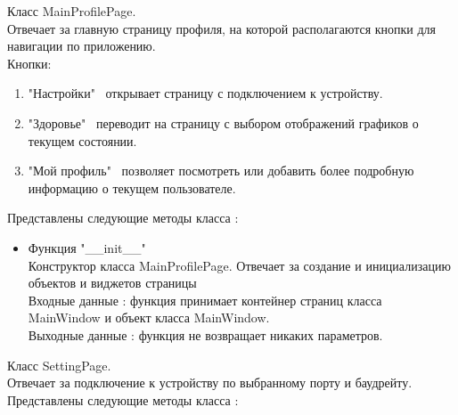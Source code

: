 \documentclass[a4document]{article}
\begin{document}
{\begin{itemize}
        Класс MainProfilePage.\\
        Отвечает за главную страницу профиля, на которой располагаются кнопки для навигации по приложению.\\
        
        Кнопки:
        \begin{enumerate}
            \item "Настройки" \  открывает страницу с подключением к устройству.
            \item "Здоровье" \  переводит на страницу с выбором отображений графиков о текущем состоянии.
            \item "Мой профиль" \  позволяет посмотреть или добавить более подробную информацию о текущем пользователе.
        \end{enumerate}
        
        Представлены следующие методы класса :
        
        \begin{itemize}
            \item Функция "\_\_init\_\_" \\
                Конструктор класса MainProfilePage. Отвечает за создание и инициализацию объектов и виджетов страницы \\
                Входные данные : функция принимает контейнер страниц класса \\MainWindow и объект класса MainWindow.\\
                Выходные данные : функция не возвращает никаких параметров.
        \end{itemize}
        
    
        Класс SettingPage.\\
        Отвечает за подключение к устройству по выбранному порту и баудрейту.
        Представлены следующие методы класса :
        

\end{itemize}}
\end{document}

